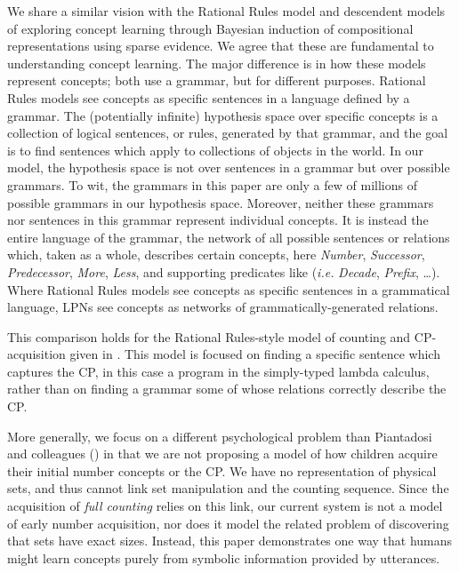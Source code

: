 \documentclass[10pt,letterpaper]{article}
\begin{document}

We share a similar vision with the Rational Rules model and descendent
models
\citep{goodman2008rational,T.D.Ullman:2012:1b1b6,PianGoodTen2012} of
exploring concept learning through Bayesian induction of compositional
representations using sparse evidence. We agree that these are
fundamental to understanding concept learning. The major difference is
in how these models represent concepts; both use a grammar, but for
different purposes. Rational Rules models see concepts as specific
sentences in a language defined by a grammar. The (potentially
infinite) hypothesis space over specific concepts is a collection of
logical sentences, or rules, generated by that grammar, and the goal
is to find sentences which apply to collections of objects in the
world. In our model, the hypothesis space is not over sentences in a
grammar but over possible grammars. To wit, the grammars in this paper
are only a few of millions of possible grammars in our hypothesis
space. Moreover, neither these grammars nor sentences in this grammar
represent individual concepts. It is instead the entire language of
the grammar, the network of all possible sentences or relations which,
taken as a whole, describes certain concepts, here \emph{Number},
\emph{Successor}, \emph{Predecessor}, \emph{More}, \emph{Less}, and
supporting predicates like ({\it i.e.} \emph{Decade}, \emph{Prefix},
\ldots). Where Rational Rules models see concepts as specific
sentences in a grammatical language, LPNs see concepts as networks of
grammatically-generated relations.

This comparison holds for the Rational Rules-style model of counting
and CP-acquisition given in \citep{PianGoodTen2012}. This model is
focused on finding a specific sentence which captures the CP, in this
case a program in the simply-typed lambda calculus, rather than on
finding a grammar some of whose relations correctly describe the CP.

More generally, we focus on a different psychological problem than
Piantadosi and colleagues (\citeyear{PianGoodTen2012}) in that we are
not proposing a model of how children acquire their initial number
concepts or the CP. We have no representation of physical sets, and
thus cannot link set manipulation and the counting sequence. Since the
acquisition of \emph{full counting} relies on this link, our current
system is not a model of early number acquisition, nor does it model
the related problem of discovering that sets have exact sizes.
Instead, this paper demonstrates one way that humans might learn
concepts purely from symbolic information provided by utterances.
\end{document}
